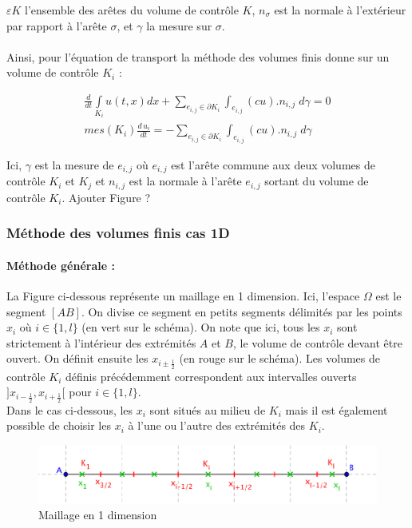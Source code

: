 \documentclass[12pt]{article}
\begin{document}
$\varepsilon K$ l'ensemble des arêtes du volume de contrôle $K$, $n_{\sigma}$ est la normale à l'extérieur par rapport à l'arête $\sigma$, et $\gamma$ la mesure sur $\sigma$.
\\
\\Ainsi, pour l'équation de transport la méthode des volumes finis donne sur un volume de contrôle $K_i$ :

\begin{eqnarray}
       \frac{d}{dt} \int\limits_{K_i} u(t,x)dx + \displaystyle \sum_{e_{i,j}\in \partial K_i} \int_{e_{i,j}} (cu).{n_{i,j}} \; d\gamma=0
       \\mes(K_i)\frac{d\,u_i}{dt}=-\displaystyle\sum_{e_{i,j}\in \partial K_i} \int_{e_{i,j}} (cu).{n_{i,j}} \; d\gamma
\end{eqnarray}

\noindent Ici, $\gamma$ est la mesure de $e_{i,j}$ où $e_{i,j}$ est l'arête commune aux deux volumes de contrôle $K_i$ et $K_j$ et $n_{i,j}$ est la normale à l'arête $e_{i,j}$ sortant du volume de contrôle $K_i$. Ajouter Figure ?
\\

\subsubsection{Méthode des volumes finis cas 1D }
\paragraph{Méthode générale : }
La Figure ci-dessous représente un maillage en 1 dimension. Ici, l'espace $\Omega$ est le segment $[AB]$. On divise ce segment en petits segments délimités par les points $x_i$ où $i\in \{1,l\}$ (en vert sur le schéma). On note que ici, tous les $x_i$ sont strictement à l'intérieur des extrémités $A$ et $B$, le volume de contrôle devant être ouvert. On définit ensuite les $x_{i\pm\frac{1}{2}}$ (en rouge sur le schéma). Les volumes de contrôle $K_i$ définis précédemment correspondent aux intervalles ouverts $]x_{i-\frac{1}{2}},x_{i+\frac{1}{2}}[$ pour $i\in \{1,l\}$.
\\Dans le cas ci-dessous, les $x_i$ sont situés au milieu de $K_i$ mais il est également possible de choisir les $x_i$ à l'une ou l'autre des extrémités des $K_i$. 

    \begin{figure}[H]
	\centering
	\includegraphics[scale=0.4]{VF2.png}
	\caption{Maillage en 1 dimension}
	\label{1D}
	\end{figure}
\end{document}

